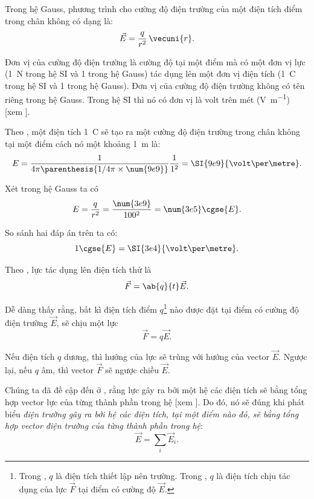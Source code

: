 Trong hệ Gauss, phương trình cho cường độ điện trường của một điện tích điểm trong chân không có dạng là:
\begin{equation}\label{eq:1_16}
	\vec{E} = \frac{q}{r^2}\, \vecuni{r}.
\end{equation}

Đơn vị của cường độ điện trường là cường độ tại một điểm mà có một đơn vị lực (\SI{1}{\newton} trong hệ SI và \SI{1}{\dyne} trong hệ Gauss) tác dụng lên một đơn vị điện tích (\SI{1}{\coulomb} trong hệ SI và \num{1} trong hệ Gauss). Đơn vị của cường độ điện trường không có tên riêng trong hệ Gauss. Trong hệ SI thì nó có đơn vị là volt trên mét (\si{\volt\per\metre}) [xem ].

Theo , một điện tích \SI{1}{\coulomb} sẽ tạo ra một cường độ điện trường trong chân không tại một điểm cách nó một khoảng \SI{1}{\metre} là:
\begin{equation*}
	E = \frac{1}{4\pi\parenthesis{1/4\pi \times \num{9e9}}} \frac{1}{1^2} = \SI{9e9}{\volt\per\metre}.
\end{equation*}

Xét trong hệ Gauss ta có
\begin{equation*}
	E = \frac{q}{r^2} = \frac{\num{3e9}}{100^2} = \num{3e5}\cgse{E}.
\end{equation*}

\noindent
So sánh hai đáp án trên ta có:
\begin{equation}\label{eq:1_17}
	1\cgse{E} = \SI{3e4}{\volt\per\metre}.
\end{equation}

Theo , lực tác dụng lên điện tích thử là
\begin{equation*}
	\vec{F} = \ab{q}{t} \vec{E}.
\end{equation*}

\noindent
Dễ dàng thấy rằng, bất kì điện tích điểm $q$\footnote{Trong , $q$ là điện tích thiết lập nên trường. Trong , $q$ là điện tích chịu tác dụng của lực $\vec{F}$ tại điểm có cường độ $\vec{E}$.} nào được đặt tại điểm có cường độ điện trường $\vec{E}$, sẽ chịu một lực
\begin{equation}\label{eq:1_18}
	\vec{F} = q \vec{E}.
\end{equation}

\noindent
Nếu điện tích $q$ dương, thì hướng của lực sẽ trùng với hướng của vector $\vec{E}$. Ngược lại, nếu $q$ âm, thì vector $\vec{F}$ sẽ ngược chiều $\vec{E}$.

Chúng ta đã đề cập đến ở , rằng lực gây ra bởi một hệ các điện tích sẽ bằng tổng hợp vector lực của từng thành phần trong hệ [xem ]. Do đó, nó sẽ đúng khi phát biểu \textit{điện trường gây ra bởi hệ các điện tích, tại một điểm nào đó, sẽ bằng tổng hợp vector điện trường của từng thành phần trong hệ}:
\begin{equation}\label{eq:1_19}
	\vec{E} = \sum_i \vec{E}_i.
\end{equation}

